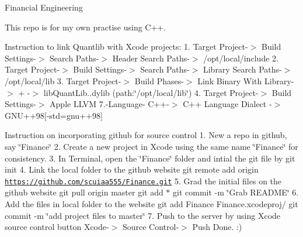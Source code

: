Financial Engineering

This repo is for my own practise using C++.

Instruction to link Quantlib with Xcode projects\+: 1. Target Project-\/$>$ Build Settings-\/$>$ Search Paths-\/$>$ Header Search Paths-\/$>$ /opt/local/include 2. Target Project-\/$>$ Build Settings-\/$>$ Search Paths-\/$>$ Library Search Paths-\/$>$ /opt/local/lib 3. Target Project-\/$>$ Build Phases-\/$>$ Link Binary With Library-\/$>$ + -\/$>$ lib\+Quant\+Lib..\+dylib (path\+:\char`\"{}/opt/local/lib\char`\"{}) 4. Target Project-\/$>$ Build Settings-\/$>$ Apple L\+L\+VM 7.-\/\+Language-\/ C++-\/$>$ C++ Language Dialect -\/$>$ G\+N\+U++98\mbox{[}-\/std=gnu++98\mbox{]}

Instruction on incorporating github for source control 1. New a repo in github, say \char`\"{}\+Finance\char`\"{} 2. Create a new project in Xcode using the same name \char`\"{}\+Finance\char`\"{} for consistency. 3. In Terminal, open the \char`\"{}\+Finance\char`\"{} folder and intial the git file by git init 4. Link the local folder to the github website git remote add origin \href{https://github.com/scuiaa555/Finance.git}{\tt https\+://github.\+com/scuiaa555/\+Finance.\+git} 5. Grad the initial files on the github website git pull origin master git add $\ast$ git commit -\/m \char`\"{}\+Grab R\+E\+A\+D\+M\+E\char`\"{} 6. Add the files in local folder to the website git add Finance Finance.\+xcodeproj/ git commit -\/m \char`\"{}add project files to master\char`\"{} 7. Push to the server by using Xcode source control button Xcode-\/$>$ Source Control-\/$>$ Push Done. \+:) 